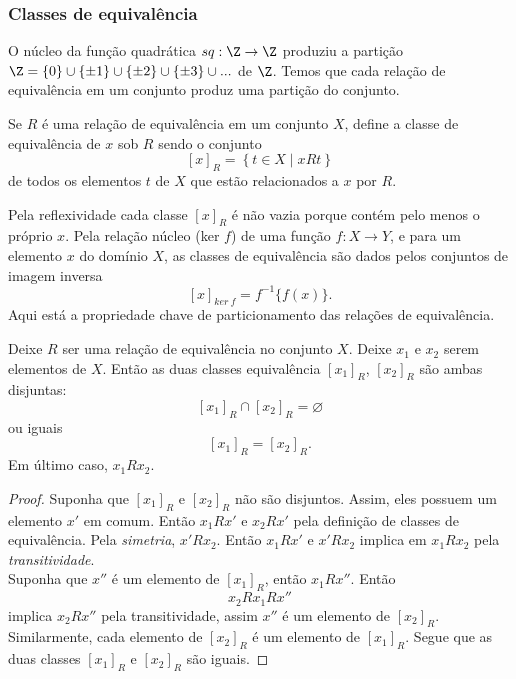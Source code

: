       \subsubsection{Classes de equivalência}
         O núcleo da função quadrática $sq: \Z \to \Z$ produziu a partição $ \Z = \{0\} \cup \{\pm 1\} \cup \{\pm 2\} \cup \{\pm 3\} \cup ...$ de $\Z$. Temos que cada relação de equivalência em um conjunto produz uma partição do conjunto.
         \begin{definition}
            Se $R$ é uma relação de equivalência em um conjunto $X$, define a classe de equivalência de $x$ sob $R$ sendo o conjunto $$ \left[x\right]_{R} = \left\{t \in X \mid x R t\right\}$$ de todos os elementos $t$ de $X$ que estão relacionados a $x$ por $R$.
         \end{definition}
         Pela reflexividade cada classe $\left[x\right]_{R}$ é não vazia porque contém pelo menos o próprio $x$. Pela relação núcleo (ker $f$) de uma função $f: X\to Y$, e para um elemento $x$ do domínio $X$, as classes de equivalência são dados pelos conjuntos de imagem inversa $$\left[x\right]_{ker\ f} = f^{-1}\{f(x)\}.$$ Aqui está a propriedade chave de particionamento das relações de equivalência.
         \begin{stat}\label{PropLag1}
            Deixe $R$ ser uma relação de equivalência no conjunto $X$. Deixe $x_{1}$ e $x_{2}$ serem elementos de $X$. Então as duas classes equivalência $\left[x_{1}\right]_{R}$, $\left[x_{2}\right]_{R}$ são ambas disjuntas: $$\left[x_{1}\right]_{R} \cap \left[x_{2}\right]_{R} = \varnothing$$ ou iguais $$\left[x_{1}\right]_{R} = \left[x_{2}\right]_{R}.$$ Em último caso, $x_{1} R x_{2}$.
            \begin{proof}
               Suponha que $\left[x_{1}\right]_{R}$ e $\left[x_{2}\right]_{R}$ não são disjuntos. Assim, eles possuem um elemento $x'$ em comum. Então $x_{1} R x'$ e $x_{2} R x'$ pela definição de classes de equivalência. Pela \emph{simetria}, $x' R x_{2}$. Então $x_{1} R x'$ e $x' R x_{2}$ implica em $x_{1} R x_{2}$ pela \emph{transitividade}.\\
               Suponha que $x''$ é um elemento de $\left[x_{1}\right]_{R}$, então $x_{1} R x''$. Então $$ x_{2} R x_{1} R x''$$ implica $x_{2} R x''$ pela transitividade, assim $x''$ é um elemento de $\left[x_{2}\right]_{R}$. Similarmente, cada elemento de $\left[x_{2}\right]_{R}$ é um elemento de $\left[x_{1}\right]_{R}$. Segue que as duas classes $\left[x_{1}\right]_{R}$ e $\left[x_{2}\right]_{R}$ são iguais.
            \end{proof}
         \end{stat}
